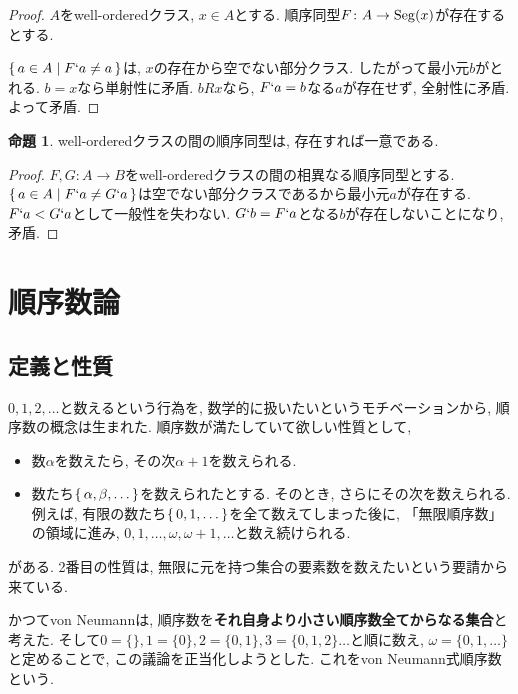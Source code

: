 \documentclass[a4paper, twoside]{bxjsarticle}
\theoremstyle{definition}
\newtheorem{prop}[thm]{命題}
\begin{document}
        \begin{proof}
            $A$をwell-orderedクラス, $x\in A$とする. 順序同型$F\colon A\to {\rm Seg}(x)$が存在するとする.
            
            $\set{a\in A|F`a \neq a}$は, $x$の存在から空でない部分クラス. したがって最小元$b$がとれる. $b=x$なら単射性に矛盾. $bRx$なら, $F`a=b$なる$a$が存在せず, 全射性に矛盾. よって矛盾.
        \end{proof}
        \begin{prop}\label{ordisounique}
            well-orderedクラスの間の順序同型は, 存在すれば一意である.
        \end{prop}
        \begin{proof}
            $F, G\colon A\to B$をwell-orderedクラスの間の相異なる順序同型とする. $\set{a\in A|F`a \neq G`a}$は空でない部分クラスであるから最小元$a$が存在する. $F`a < G`a$として一般性を失わない. $G`b = F`a$となる$b$が存在しないことになり, 矛盾.
        \end{proof}
    \cleardoublepage
    
    \section{順序数論}
    \subsection{定義と性質}
    $0, 1, 2, \dots$と数えるという行為を, 数学的に扱いたいというモチベーションから, 順序数の概念は生まれた. 順序数が満たしていて欲しい性質として, 
    \begin{itemize}
        \item 数$\alpha$を数えたら, その次$\alpha+1$を数えられる.
        \item 数たち$\set{\alpha, \beta, \dots}$を数えられたとする. そのとき, さらにその次を数えられる. 例えば, 有限の数たち$\set{0, 1, \dots}$を全て数えてしまった後に, 「無限順序数」の領域に進み, $0, 1, \dots, \omega, \omega+1, \dots$と数え続けられる.
    \end{itemize}
    がある. 2番目の性質は, 無限に元を持つ集合の要素数を数えたいという要請から来ている. 
    
    かつてvon Neumannは, 順序数を\textbf{それ自身より小さい順序数全てからなる集合}と考えた. そして$0 = \{\}, 1=\{0\}, 2=\{0, 1\}, 3=\{0, 1, 2\}\dots$と順に数え, $\omega = \{0, 1, \dots\}$と定めることで, この議論を正当化しようとした. これをvon Neumann式順序数という.
    
\end{document}

